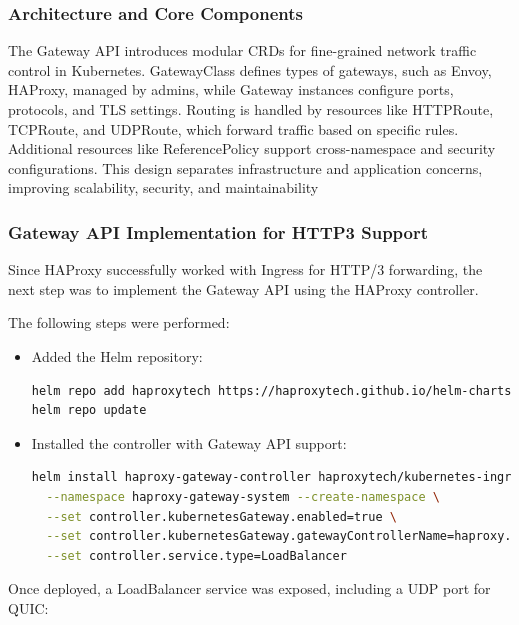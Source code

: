 \subsubsection{Architecture and Core Components}
The Gateway API introduces modular CRDs for fine-grained network traffic control in Kubernetes. GatewayClass defines types of gateways, such as Envoy, HAProxy, managed by admins, while Gateway instances configure ports, protocols, and TLS settings. Routing is handled by resources like HTTPRoute, TCPRoute, and UDPRoute, which forward traffic based on specific rules. Additional resources like ReferencePolicy support cross-namespace and security configurations. This design separates infrastructure and application concerns, improving scalability, security, and maintainability


\subsubsection{Gateway API Implementation for HTTP3 Support}

Since HAProxy successfully worked with Ingress for HTTP/3 forwarding, the next step was to implement the Gateway API using the HAProxy controller.


The following steps were performed:

\begin{itemize}
  \item Added the Helm repository:
\begin{lstlisting}[language=bash]
helm repo add haproxytech https://haproxytech.github.io/helm-charts
helm repo update
\end{lstlisting}

  \item Installed the controller with Gateway API support:
\begin{lstlisting}[language=bash]
helm install haproxy-gateway-controller haproxytech/kubernetes-ingress \
  --namespace haproxy-gateway-system --create-namespace \
  --set controller.kubernetesGateway.enabled=true \
  --set controller.kubernetesGateway.gatewayControllerName=haproxy.org/gateway-controller \
  --set controller.service.type=LoadBalancer
\end{lstlisting}
\end{itemize}

Once deployed, a LoadBalancer service was exposed, including a UDP port for QUIC:

